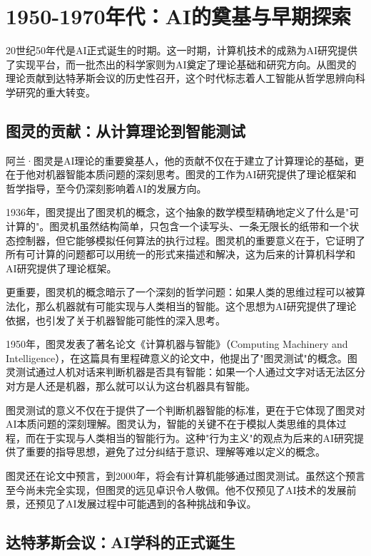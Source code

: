 \section{1950-1970年代：AI的奠基与早期探索}

20世纪50年代是AI正式诞生的时期。这一时期，计算机技术的成熟为AI研究提供了实现平台，而一批杰出的科学家则为AI奠定了理论基础和研究方向。从图灵的理论贡献到达特茅斯会议的历史性召开，这个时代标志着人工智能从哲学思辨向科学研究的重大转变。

\subsection{图灵的贡献：从计算理论到智能测试}

阿兰·图灵是AI理论的重要奠基人，他的贡献不仅在于建立了计算理论的基础，更在于他对机器智能本质问题的深刻思考。图灵的工作为AI研究提供了理论框架和哲学指导，至今仍深刻影响着AI的发展方向。

1936年，图灵提出了图灵机的概念，这个抽象的数学模型精确地定义了什么是"可计算的"。图灵机虽然结构简单，只包含一个读写头、一条无限长的纸带和一个状态控制器，但它能够模拟任何算法的执行过程。图灵机的重要意义在于，它证明了所有可计算的问题都可以用统一的形式来描述和解决，这为后来的计算机科学和AI研究提供了理论框架。

更重要，图灵机的概念暗示了一个深刻的哲学问题：如果人类的思维过程可以被算法化，那么机器就有可能实现与人类相当的智能。这个思想为AI研究提供了理论依据，也引发了关于机器智能可能性的深入思考。

1950年，图灵发表了著名论文《计算机器与智能》（Computing Machinery and Intelligence），在这篇具有里程碑意义的论文中，他提出了"图灵测试"的概念。图灵测试通过人机对话来判断机器是否具有智能：如果一个人通过文字对话无法区分对方是人还是机器，那么就可以认为这台机器具有智能。

图灵测试的意义不仅在于提供了一个判断机器智能的标准，更在于它体现了图灵对AI本质问题的深刻理解。图灵认为，智能的关键不在于模拟人类思维的具体过程，而在于实现与人类相当的智能行为。这种"行为主义"的观点为后来的AI研究提供了重要的指导思想，避免了过分纠结于意识、理解等难以定义的概念。

图灵还在论文中预言，到2000年，将会有计算机能够通过图灵测试。虽然这个预言至今尚未完全实现，但图灵的远见卓识令人敬佩。他不仅预见了AI技术的发展前景，还预见了AI发展过程中可能遇到的各种挑战和争议。

\subsection{达特茅斯会议：AI学科的正式诞生}

